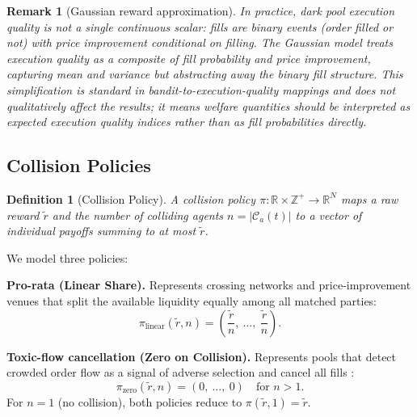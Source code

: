 \documentclass[11pt]{article}
\newtheorem{definition}{Definition}
\newtheorem{remark}{Remark}
\begin{document}
\begin{remark}[Gaussian reward approximation]
In practice, dark pool execution quality is not a single continuous scalar:
fills are binary events (order filled or not) with price improvement
conditional on filling.
The Gaussian model treats execution quality as a composite of fill probability
and price improvement, capturing mean and variance but abstracting away
the binary fill structure.
This simplification is standard in bandit-to-execution-quality mappings
\citep{ganchev2010} and does not qualitatively affect the results;
it means welfare quantities should be interpreted as expected execution
quality indices rather than as fill probabilities directly.
\end{remark}

\subsection{Collision Policies}

\begin{definition}[Collision Policy]
A collision policy $\pi : \mathbb{R} \times \mathbb{Z}^+ \to \mathbb{R}^N$
maps a raw reward $\tilde{r}$ and the number of colliding agents $n =
|\mathcal{C}_a(t)|$ to a vector of individual payoffs summing to at most
$\tilde{r}$.
\end{definition}

We model three policies:

\textbf{Pro-rata (Linear Share).}
Represents crossing networks and price-improvement venues that split the
available liquidity equally among all matched parties:
\begin{equation}
  \pi_{\text{linear}}(\tilde{r}, n) = \left(\frac{\tilde{r}}{n},\ \ldots,\ \frac{\tilde{r}}{n}\right).
\end{equation}

\textbf{Toxic-flow cancellation (Zero on Collision).}
Represents pools that detect crowded order flow as a signal of adverse
selection and cancel all fills \citep{zhu2014}:
\begin{equation}
  \pi_{\text{zero}}(\tilde{r}, n) = (0,\ \ldots,\ 0) \quad \text{for } n > 1.
\end{equation}
For $n = 1$ (no collision), both policies reduce to $\pi(\tilde{r}, 1) = \tilde{r}$.
\end{document}
